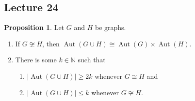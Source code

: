 \documentclass[10pt,letterpaper,cm]{nupset}
\theoremstyle{definition}
\theoremstyle{theorem}
\newtheorem{prop}[definition]{Proposition}
\theoremstyle{remark}
\newcommand{\N}{\mathbb N}
\newcommand{\1}{\mathbf{1}}
\newcommand{\0}{\vec 0}
\DeclareMathOperator{\aut}{Aut}
\begin{document}
\subsection{Lecture 24}

\begin{prop}
Let $G$ and $H$ be graphs. 
\begin{enumerate}
\item If $G \not\cong H$, then $\aut(G \cup H) \cong \aut(G) \times \aut(H)$. 
\item There is some $k\in \N$ such that  
\begin{enumerate}
\item $\left\lvert{\aut(G \cup H)}\right\rvert \geq 2k$ whenever $G \cong H$  and 
\item $\left\lvert{\aut(G \cup H)}\right\rvert \leq k$ whenever $G \not\cong H$. 
\end{enumerate}
\end{enumerate}
\end{prop}
\end{document}
